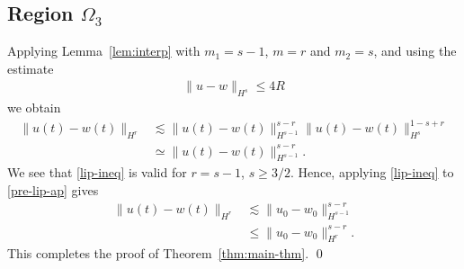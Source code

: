 \documentclass[12pt,reqno]{amsart}
\numberwithin{equation}{section}  %
\numberwithin{figure}{section}
\begin{document}
\subsection{Region \texorpdfstring{$\Omega_{3}$}{}} 
\label{ssec:case-2}
%
%
Applying Lemma~\ref{lem:interp} with $m_{1} = s-1$, $m =r$ and $m_{2} = s$, and 
using the estimate
%
%
\begin{equation*}
\begin{split}
\|u - w \|_{H^{s}} \le 4R
\end{split}
\end{equation*}
%
%
we obtain
%
%
\begin{equation}
\label{pre-lip-ap}
\begin{split}
\| u(t) - w(t) \|_{H^{r}} & \lesssim \| u(t) - w(t) \|_{H^{s-1}}^{s-r} \|u(t)
- w(t)\|_{H^{s}}^{1-s+r}
\\
& \simeq \| u(t) - w(t) \|_{H^{s-1}}^{s-r}.
\end{split}
\end{equation}
%
%
We see that \eqref{lip-ineq} is valid for  $r = s-1$, $s \ge 3/2$. Hence,
applying \eqref{lip-ineq} to \eqref{pre-lip-ap} gives
%
%
\begin{equation*}
\begin{split}
\| u(t) - w(t) \|_{H^{r}} & \lesssim  \|u_{0} - w_{0}\|_{H^{s-1}}^{s-r} 
\\
& \le
\|u_{0} - w_{0}\|_{H^{r}}^{s-r}.
\end{split}
\end{equation*}
%
This completes the proof of Theorem~\ref{thm:main-thm}. \qed
%
%
%
%
%
%
%
%
%
%
\end{document}
